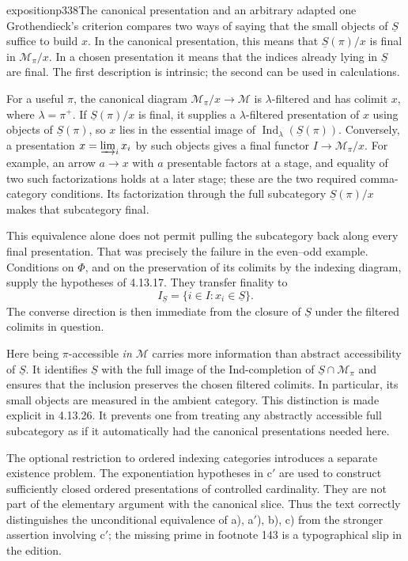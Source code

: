 \begin{dcomment}{exposition}{p338}{The canonical presentation and an arbitrary adapted one}
Grothendieck's criterion compares two ways of saying that the small objects of $\underline S$ suffice to build $x$. In the canonical presentation, this means that $\underline S(\pi)/x$ is final in $\mathcal M_\pi/x$. In a chosen presentation it means that the indices already lying in $\underline S$ are final. The first description is intrinsic; the second can be used in calculations.

For a useful $\pi$, the canonical diagram $\mathcal M_\pi/x\to\mathcal M$ is $\lambda$-filtered and has colimit $x$, where $\lambda=\pi^+$. If $\underline S(\pi)/x$ is final, it supplies a $\lambda$-filtered presentation of $x$ using objects of $\underline S(\pi)$, so $x$ lies in the essential image of $\operatorname{Ind}_\lambda(\underline S(\pi))$. Conversely, a presentation $x=\varinjlim_i x_i$ by such objects gives a final functor $I\to\mathcal M_\pi/x$. For example, an arrow $a\to x$ with $a$ presentable factors at a stage, and equality of two such factorizations holds at a later stage; these are the two required comma-category conditions. Its factorization through the full subcategory $\underline S(\pi)/x$ makes that subcategory final.

This equivalence alone does not permit pulling the subcategory back along every final presentation. That was precisely the failure in the even--odd example. Conditions on $\Phi$, and on the preservation of its colimits by the indexing diagram, supply the hypotheses of 4.13.17. They transfer finality to
\[
 I_{\underline S}
 =\{i\in I:x_i\in\underline S\}.
\]
The converse direction is then immediate from the closure of $\underline S$ under the filtered colimits in question.

Here being $\pi$-accessible \emph{in $\mathcal M$} carries more information than abstract accessibility of $\underline S$. It identifies $\underline S$ with the full image of the Ind-completion of $\underline S\cap\mathcal M_\pi$ and ensures that the inclusion preserves the chosen filtered colimits. In particular, its small objects are measured in the ambient category. This distinction is made explicit in 4.13.26. It prevents one from treating any abstractly accessible full subcategory as if it automatically had the canonical presentations needed here.

The optional restriction to ordered indexing categories introduces a separate existence problem. The exponentiation hypotheses in c$'$ are used to construct sufficiently closed ordered presentations of controlled cardinality. They are not part of the elementary argument with the canonical slice. Thus the text correctly distinguishes the unconditional equivalence of a), a$'$), b), c) from the stronger assertion involving c$'$; the missing prime in footnote 143 is a typographical slip in the edition.
\end{dcomment}


